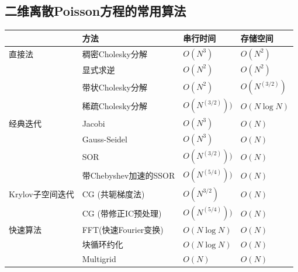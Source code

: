 \documentclass[12pt,a4paper]{article}
\begin{document}
\subsection*{ 二维离散Poisson方程的常用算法}
\begin{tabular}{l|lll}
\hline
{}&方法&串行时间&存储空间\\
\hline
\hline
直接法&稠密Cholesky分解&$O(N^3)$&$O(N^2)$\\
{}&显式求逆&$O(N^2)$&$O(N^2)$\\
{}&带状Cholesky分解&$O(N^2)$&$O(N^(3/2))$\\
{}&稀疏Cholesky分解&$O(N^(3/2)))$&$O(N\log N)$\\
\hline
经典迭代&Jacobi&$O(N^3)$&$O(N)$\\
{}&Gauss-Seidel&$O(N^3)$&$O(N)$\\
{}&SOR&$O(N^(3/2)))$&$O(N)$\\
{}& 带Chebyshev加速的SSOR &$O(N^(5/4)))$&$O(N)$\\
\hline
Krylov子空间迭代&CG (共轭梯度法)&$O(N^{3/2})$&$O(N)$\\
{}&CG (带修正IC预处理)&$O(N^(5/4)))$&$O(N)$\\
\hline
快速算法&FFT(快速Fourier变换)&$O(N\log N)$&$O(N)$\\
{}&块循环约化&$O(N\log N)$&$O(N)$\\
{}&Multigrid&$O(N)$&$O(N)$\\
\hline
\end{tabular}
\end{document}
